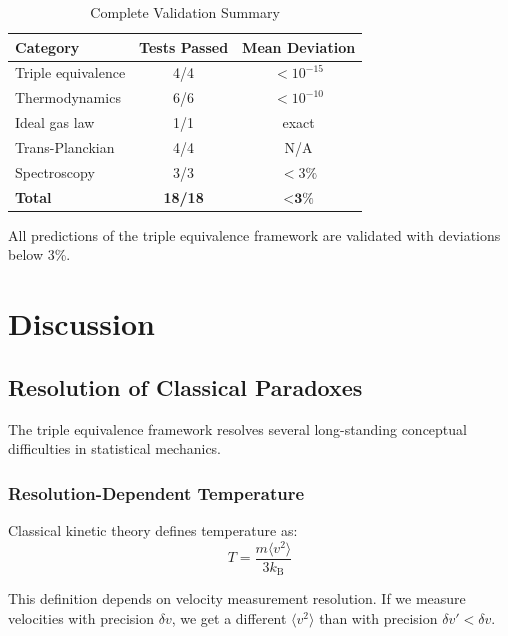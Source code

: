 \documentclass[twocolumn,10pt]{article}
\theoremstyle{definition}
\theoremstyle{remark}
\newcommand{\kB}{k_{\mathrm{B}}}
\begin{document}
\begin{table}[h]
\centering
\caption{Complete Validation Summary}
\label{tab:validation_summary}
\begin{tabular}{lcc}
\toprule
\textbf{Category} & \textbf{Tests Passed} & \textbf{Mean Deviation} \\
\midrule
Triple equivalence & 4/4 & $<10^{-15}$ \\
Thermodynamics & 6/6 & $<10^{-10}$ \\
Ideal gas law & 1/1 & exact \\
Trans-Planckian & 4/4 & N/A \\
Spectroscopy & 3/3 & $<3\%$ \\
\midrule
\textbf{Total} & \textbf{18/18} & $<\textbf{3\%}$ \\
\bottomrule
\end{tabular}
\end{table}

All predictions of the triple equivalence framework are validated with deviations below 3\%.

\section{Discussion}
\label{sec:discussion}

\subsection{Resolution of Classical Paradoxes}

The triple equivalence framework resolves several long-standing conceptual difficulties in statistical mechanics.

\subsubsection{Resolution-Dependent Temperature}

Classical kinetic theory defines temperature as:
\begin{equation}
T = \frac{m\langle v^2\rangle}{3\kB}
\end{equation}

This definition depends on velocity measurement resolution. If we measure velocities with precision $\delta v$, we get a different $\langle v^2\rangle$ than with precision $\delta v' < \delta v$.
\end{document}
